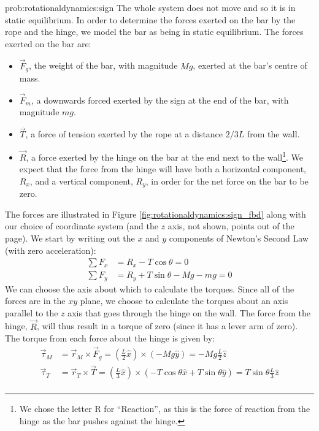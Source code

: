 \begin{solution}{prob:rotationaldynamics:sign}\label{soln:rotationaldynamics:sign}
The whole system does not move and so it is in static equilibrium. In order to determine the forces exerted on the bar by the rope and the hinge, we model the bar as being in static equilibrium. The forces exerted on the bar are:
\begin{itemize}
\item $\vec F_g$, the weight of the bar, with magnitude $Mg$, exerted at the bar's centre of mass.
\item $\vec F_m$, a downwards forced exerted by the sign at the end of the bar, with magnitude $mg$.
\item $\vec T$, a force of tension exerted by the rope at a distance $2/3 L$ from the wall.
\item $\vec R$, a force exerted by the hinge on the bar at the end next to the wall\footnote{We chose the letter R for ``Reaction'', as this is the force of reaction from the hinge as the bar pushes against the hinge.}. We expect that the force from the hinge will have both a horizontal component, $R_x$, and a vertical component, $R_y$, in order for the net force on the bar to be zero.
\end{itemize}
The forces are illustrated in Figure \ref{fig:rotationaldynamics:sign_fbd} along with our choice of coordinate system (and the $z$ axis, not shown, points out of the page).
We start by writing out the $x$ and $y$ components of Newton's Second Law (with zero acceleration):
\begin{align*}
\sum F_x &= R_x - T\cos\theta =0\\
\sum F_y &= R_y + T\sin\theta - Mg - mg=0
\end{align*}
We can choose the axis about which to calculate the torques. Since all of the forces are in the $xy$ plane, we choose to calculate the torques about an axis parallel to the $z$ axis that goes through the hinge on the wall. The force from the hinge, $\vec R$, will thus result in a torque of zero (since it has a lever arm of zero). The torque from each force about the hinge is given by:
\begin{align*}
\vec \tau_M &= \vec r_M \times \vec F_g = \left(\frac{L}{2}\hat x\right) \times (-Mg \hat y) =-Mg\frac{L}{2} \hat z\\
\vec \tau_T &= \vec r_T \times \vec T = \left(\frac{L}{3}\hat x\right) \times (-T\cos\theta \hat x + T\sin\theta \hat y) =T\sin\theta\frac{L}{3} \hat z\\

\end{align*}
\end{solution}

